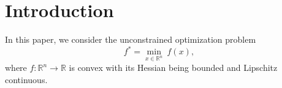 \documentclass{mcom-l}
\numberwithin{equation}{section}
\begin{document}
\section{Introduction}
\label{Intro}
In this paper, we consider the unconstrained optimization problem \begin{equation} \label{eq.main problem} f^* = \min_{x\in \mathbb{R}^n}~ f(x), \end{equation} where $f:\mathbb{R}^n\to \mathbb{R}$ is convex with its Hessian being bounded and Lipschitz continuous.




\end{document}
